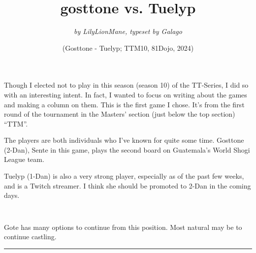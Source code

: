 \documentclass{article}
\begin{document}
\large
\title{\textbf{gosttone vs. Tuelyp}}
\author{\textit{by LilyLionMane, typeset by Galago}}
\date{(Gosttone - Tuelyp; TTM10, 81Dojo, 2024)}
\maketitle



Though I elected not to play in this season (season 10) of the TT-Series, I did so with an interesting intent. In fact, I wanted to focus on writing about the games and making a column on them. This is the first game I chose. It's from the first round of the tournament in the Masters' section (just below the top section) ``TTM''.

The players are both individuals who I've known for quite some time. Gosttone (2-Dan), Sente in this game, plays the second board on Guatemala's World Shogi League team.

Tuelyp (1-Dan) is also a very strong player, especially as of the past few weeks, and is a Twitch streamer. I think she should be promoted to 2-Dan in the coming days.
\pagebreak

\sidebyside
{
\newline
{}
}
{
\normalsize
{}

\texttt{ 
}


\texttt{}


\noindent Gote has many options to continue from this position. Most natural may be to continue castling.
}

\pagebreak

\begin{chessmoves}{}
\end{chessmoves}

\vspace{1in}
\hrule
\vspace{1in}

\begin{shogimoves}
\end{shogimoves}
\end{document}
